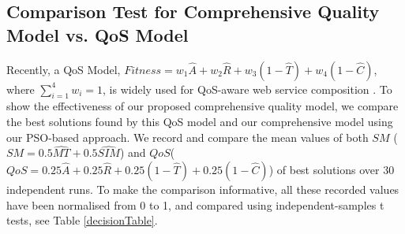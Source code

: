 \documentclass{llncs}
\begin{document}
\subsection{Comparison Test for Comprehensive Quality Model vs. QoS Model}\label{comparisonTest}

Recently, a QoS Model, $Fitness = w_1 \hat{A} + w_2 \hat{R} + w_3(1 - \hat{T}) + w_4(1 - \hat{C})$, where $\sum_{i=1}^{4} w_i = 1$, is widely used for QoS-aware web service composition \cite{ma2015hybrid,da2016particle,da2015graphevol}. To show the effectiveness of our proposed comprehensive quality model, we compare the best solutions found by this QoS model and our comprehensive model using our PSO-based approach. We record and compare the mean values of both $SM$ ($SM = 0.5 \hat{MT} + 0.5 \hat{SIM}$) and $QoS$($QoS = 0.25 \hat{A} + 0.25 \hat{R} + 0.25(1 - \hat{T}) + 0.25(1 - \hat{C})$) of best solutions over 30 independent runs. To make the comparison informative, all these recorded values have been normalised from 0 to 1, and compared using independent-samples t tests, see Table \ref{decisionTable}. 
\end{document}
